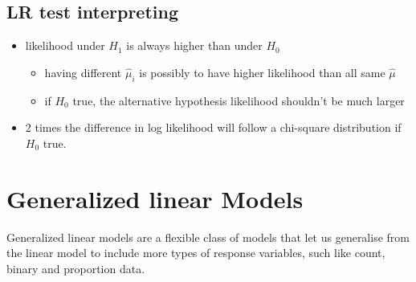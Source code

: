 \documentclass{article}
\theoremstyle{definition}
\theoremstyle{thrm}
\theoremstyle{lma}
\theoremstyle{ppst}
\theoremstyle{crlr}
\begin{document}
\subsection{LR test interpreting}
\begin{itemize}
	\item likelihood under $H_1$ is always higher than under $H_0$
	\begin{itemize}
		\item having different $\hat{\mu}_i$ is possibly to have higher likelihood than all same $\hat{\mu}$
		\item if $H_0$ true, the alternative hypothesis likelihood shouldn't be much larger
	\end{itemize}
	\item 2 times the difference in log likelihood will follow a chi-square distribution if $H_0$ true.
\end{itemize}


\section{Generalized linear Models}
Generalized linear models are a flexible class of models that let us generalise from the linear model to include more types of response variables, such like count, binary and proportion data.
\end{document}
